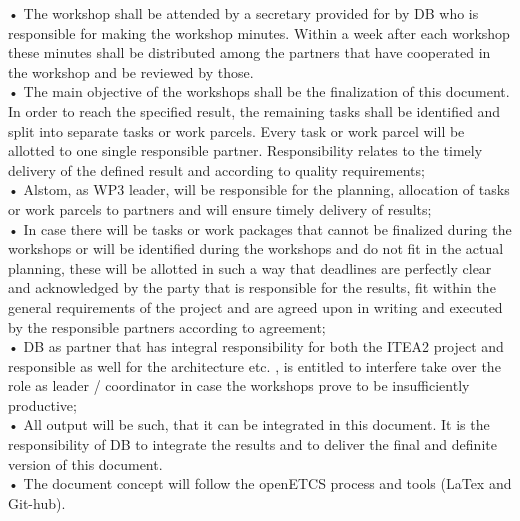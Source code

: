 \documentclass{template/openetcs_report}
\begin{document}
•	The workshop shall be attended by a secretary provided for by DB who is responsible for making the workshop minutes. Within a week after each workshop these minutes shall be distributed among the partners that have cooperated in the workshop and be reviewed by those. \\
•	The main objective of the workshops shall be the finalization of this document. In order to reach the specified result, the remaining tasks shall be identified and split into separate tasks or work parcels. Every task or work parcel will be allotted to one single responsible partner. Responsibility relates to the timely delivery of the defined result and according to quality requirements;\\
•	Alstom, as WP3 leader, will be responsible for the planning, allocation of tasks or work parcels to partners and will ensure timely delivery of results;\\
•	In case there will be tasks or work packages that cannot be finalized during the workshops or will be identified during the workshops and do not fit in the actual planning, these will be allotted in such a way that deadlines are perfectly clear and acknowledged by the party that is responsible for the results, fit within the general requirements of the project and are agreed upon in writing and executed by the responsible partners according to agreement;\\
•	DB as partner that has integral responsibility for both the ITEA2 project and responsible as well for the architecture etc. , is entitled to interfere take over the role as leader / coordinator in case the workshops prove to be insufficiently productive;\\
•	All output will be such, that it can be integrated in this document. It is the responsibility of DB to integrate the results and to deliver the final and definite version of this document. \\
•	The document concept will follow the openETCS process and tools (LaTex and Git-hub).\\
\end{document}
